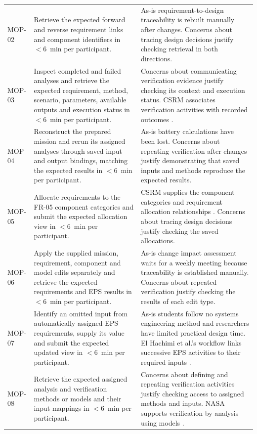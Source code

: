 \begin{longtable}{@{}P{0.13\ReportTableBodyWidth}P{0.45\ReportTableBodyWidth}P{0.42\ReportTableBodyWidth}@{}}
\addlinespace[3pt]
MOP-02 & Retrieve the expected forward and reverse requirement links and component identifiers in $<6$~min per participant. & As-is requirement-to-design traceability is rebuilt manually after changes. Concerns about tracing design decisions justify checking retrieval in both directions. \\
\addlinespace[3pt]
MOP-03 & Inspect completed and failed analyses and retrieve the expected requirement, method, scenario, parameters, available outputs and execution status in $<6$~min per participant. & Concerns about communicating verification evidence justify checking its context and execution status. CSRM associates verification activities with recorded outcomes \citep[Sec.~6.4]{omg2025csrm}. \\
\addlinespace[3pt]
MOP-04 & Reconstruct the prepared mission and rerun its assigned analyses through saved input and output bindings, matching the expected results in $<6$~min per participant. & As-is battery calculations have been lost. Concerns about repeating verification after changes justify demonstrating that saved inputs and methods reproduce the expected results. \\
\addlinespace[3pt]
MOP-05 & Allocate requirements to the FR-05 component categories and submit the expected allocation view in $<6$~min per participant. & CSRM supplies the component categories and requirement allocation relationships \citep{omg2025csrm,incose2025csrmmodel}. Concerns about tracing design decisions justify checking the saved allocations. \\
\addlinespace[3pt]
MOP-06 & Apply the supplied mission, requirement, component and model edits separately and retrieve the expected requirements and EPS results in $<6$~min per participant. & As-is change impact assessment waits for a weekly meeting because traceability is established manually. Concerns about repeated verification justify checking the results of each edit type. \\
\addlinespace[3pt]
MOP-07 & Identify an omitted input from automatically assigned EPS requirements, supply its value and submit the expected updated view in $<6$~min per participant. & As-is students follow no systems engineering method and researchers have limited practical design time. El Hachimi et al.'s workflow links successive EPS activities to their required inputs \citep[Secs.~2--4]{handpicked-0003}. \\
\addlinespace[3pt]
MOP-08 & Retrieve the expected assigned analysis and verification methods or models and their input mappings in $<6$~min per participant. & Concerns about defining and repeating verification activities justify checking access to assigned methods and inputs. NASA supports verification by analysis using models \citep[Sec.~5.3.1.2]{nasa2016systems}. \\

\end{longtable}
